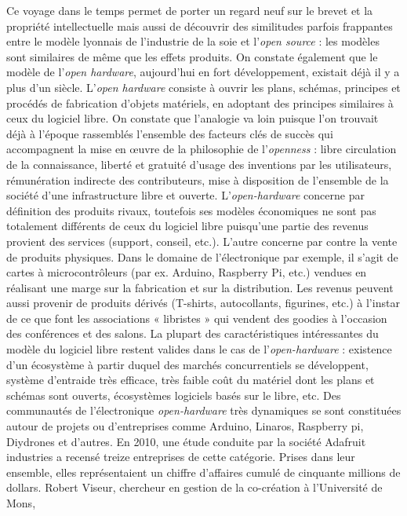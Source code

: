 \documentclass{FramateX}
\begin{document}
\begin{refsection}
Ce voyage dans le temps permet de porter un regard neuf sur le brevet et
la propriété intellectuelle mais aussi de découvrir des similitudes
parfois frappantes entre le modèle lyonnais de l'industrie de la soie
et l'\textit{open source} : les modèles sont similaires de même que les
effets produits. On constate également que le modèle de l'\textit{open
hardware}, aujourd'hui en fort développement, existait déjà il y a plus
d'un siècle. L'\textit{open hardware} consiste à ouvrir les plans,
schémas, principes et procédés de fabrication d'objets matériels, en
adoptant des principes similaires à ceux du logiciel libre. On constate
que l'analogie va loin puisque l'on trouvait déjà à l'époque rassemblés
l'ensemble des facteurs clés de succès qui accompagnent la mise en
œuvre de la philosophie de l'\textit{openness} : libre circulation de
la connaissance, liberté et gratuité d'usage des inventions par les
utilisateurs, rémunération indirecte des contributeurs, mise à
disposition de l'ensemble de la société d'une infrastructure libre et
ouverte. L'\textit{open-hardware} concerne par définition des produits
rivaux, toutefois ses modèles économiques ne sont pas totalement
différents de ceux du logiciel libre puisqu'une partie des revenus
provient des services (support, conseil, etc.). L'autre concerne par
contre la vente de produits physiques. Dans le domaine de
l'électronique par exemple, il s'agit de cartes à microcontrôleurs (par
ex. Arduino, Raspberry Pi, etc.) vendues en réalisant une marge sur la
fabrication et sur la distribution. Les revenus peuvent aussi provenir
de produits dérivés (T-shirts, autocollants, figurines, etc.) à
l'instar de ce que font les associations « libristes » qui vendent des
goodies à l'occasion des conférences et des salons. La plupart des
caractéristiques intéressantes du modèle du logiciel libre restent
valides dans le cas de l'\textit{open-hardware} : existence d'un
écosystème à partir duquel des marchés concurrentiels se développent,
système d'entraide très efficace, très faible coût du matériel dont les
plans et schémas sont ouverts, écosystèmes logiciels basés sur le
libre, etc. Des communautés de l'électronique \textit{open-hardware}
très dynamiques se sont constituées autour de projets ou d'entreprises
comme Arduino, Linaros, Raspberry pi, Diydrones et
d'autres. En 2010, une étude conduite par la société
Adafruit industries a recensé treize entreprises de cette catégorie.
Prises dans leur ensemble, elles représentaient un chiffre d'affaires
cumulé de cinquante millions de dollars. Robert Viseur, chercheur en
gestion de la co-création à l'Université de Mons,

\end{refsection}
\end{document}
